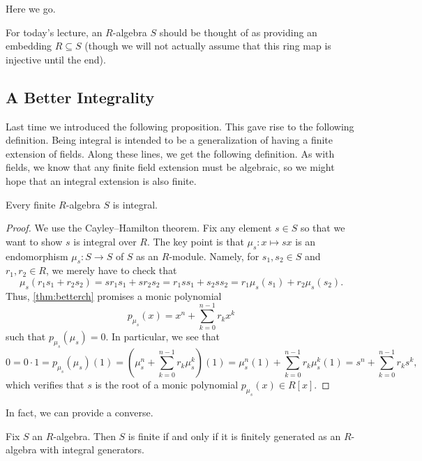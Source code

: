 
Here we go.
\begin{convention}
	For today's lecture, an $R$-algebra $S$ should be thought of as providing an embedding $R\subseteq S$ (though we will not actually assume that this ring map is injective until the end).
\end{convention}

\subsection{A Better Integrality}
Last time we introduced the following proposition.
\integralitydef*
\noindent This gave rise to the following definition.
\integraldefi*
\noindent Being integral is intended to be a generalization of having a finite extension of fields. Along these lines, we get the following definition.
\finitedefi*
\noindent As with fields, we know that any finite field extension must be algebraic, so we might hope that an integral extension is also finite.
\begin{lemma} \label{lem:finiteimpliesintegral}
	Every finite $R$-algebra $S$ is integral.
\end{lemma}
\begin{proof}
	We use the Cayley--Hamilton theorem. Fix any element $s\in S$ so that we want to show $s$ is integral over $R$. The key point is that $\mu_s:x\mapsto sx$ is an endomorphism $\mu_s:S\to S$ of $S$ as an $R$-module. Namely, for $s_1,s_2\in S$ and $r_1,r_2\in R$, we merely have to check that
	\[\mu_s(r_1s_1+r_2s_2)=sr_1s_1+sr_2s_2=r_1ss_1+s_2ss_2=r_1\mu_s(s_1)+r_2\mu_s(s_2).\]
	Thus, \autoref{thm:betterch} promises a monic polynomial
	\[p_{\mu_s}(x)=x^n+\sum_{k=0}^{n-1}r_kx^k\]
	such that $p_{\mu_s}(\mu_s)=0$. In particular, we see that
	\[0=0\cdot1=p_{\mu_s}(\mu_s)(1)=\left(\mu_s^n+\sum_{k=0}^{n-1}r_k\mu_s^k\right)(1)=\mu_s^n(1)+\sum_{k=0}^{n-1}r_k\mu_s^k(1)=s^n+\sum_{k=0}^{n-1}r_ks^k,\]
	which verifies that $s$ is the root of a monic polynomial $p_{\mu_s}(x)\in R[x]$.
\end{proof}
In fact, we can provide a converse.
\begin{lemma} \label{lem:betterfinite}
	Fix $S$ an $R$-algebra. Then $S$ is finite if and only if it is finitely generated as an $R$-algebra with integral generators.
\end{lemma}
